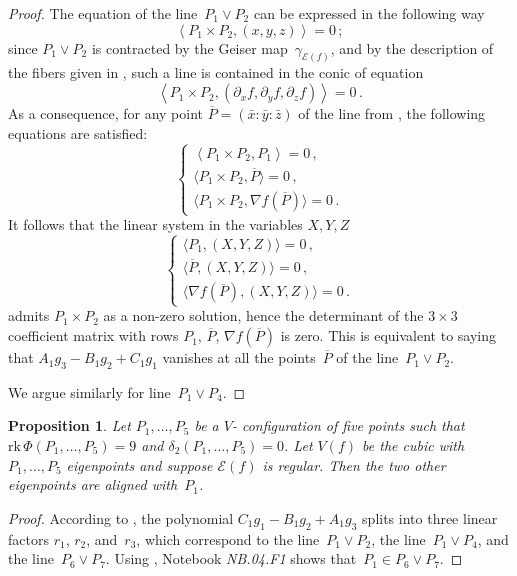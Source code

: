 \documentclass[a4paper, 11pt, reqno]{amsart}
\theoremstyle{plain}
\newtheorem{prop}[lemma]{Proposition}
\theoremstyle{definition}
\newcommand{\p}{\mathbb{P}}
\newcommand{\de}{\partial}
\newcommand{\nb}[2]{\textsl{{NB}.{#1}.{#2}}}
\newcommand{\rk}{\ensuremath{\mathrm{rk}}}
\newcommand{\Eig}[1]{\mathcal{E}\!\left( {#1} \right)}
\begin{document}
\begin{proof}
The equation of the line~$P_1 \vee P_2$ can be expressed in the following way
%
\begin{equation}
\label{eq:lineP1P2}
  \left\langle P_1 \times P_2, (x,y,z) \right\rangle = 0 \,;
\end{equation}
%
since $P_1 \vee P_2$ is contracted by the Geiser map~$\gamma_{\Eig{f}}$,
and by the description of the fibers given in , such a line is contained in the conic of equation
%
\[
  \left\langle P_1 \times P_2, (\de_x f, \de_y f, \de_z f) \right\rangle = 0 \,.
\]
%
As a consequence, for any point $\overline{P} = (\bar x: \bar y: \bar z)$ of the line from , the following equations are satisfied:
%
\[
  \left\{
  \begin{array}{l}
    \left\langle P_1 \times P_2, P_1 \right\rangle = 0 \,,\\[2pt]
    \bigl\langle P_1 \times P_2, \overline{P} \bigr\rangle = 0 \,,\\[2pt]
    \bigl\langle P_1 \times P_2, \nabla f (\overline{P}) \bigr\rangle = 0 \,.
  \end{array}
  \right.
\]
%
It follows that the linear system in the variables $X,Y,Z$
%
\[
  \left\{
  \begin{array}{l}
    \bigl\langle P_1, (X,Y,Z) \bigr\rangle = 0 \,,\\[2pt]
    \bigl\langle \overline{P}, (X,Y,Z) \bigr\rangle = 0 \,,\\[2pt]
    \bigl\langle \nabla f (\overline{P}),
    (X,Y,Z) \bigr\rangle = 0 \,.
  \end{array}
  \right.
\]
%
admits $P_1 \times P_2$ as a non-zero solution,
hence the determinant of the $3 \times 3$ coefficient matrix with rows
 $P_1$, $\overline{P}$, $\nabla f (\overline{P})$ is zero. This is equivalent to saying that $A_1 g_3 - B_1 g_2 + C_1 g_1$ vanishes at all the points~$\overline{P}$ of the line~$P_1 \vee P_2$.

We argue similarly for line~$P_1 \vee P_4$.
\end{proof}
%
\begin{prop}
\label{proposition:third_alignment}
Let $P_1, \dots, P_5$ be a $V$- configuration of five points such that  
$\rk\, \Phi(P_1, \dots, P_5) = 9$ and
$\delta_2(P_1, \dots, P_5) = 0$. Let $V(f)$ be
the cubic with $P_1, \dots, P_5$
eigenpoints and suppose $\Eig{f}$ is 
regular. Then the two other eigenpoints are aligned with~$P_1$.
\end{prop}
\begin{proof}
According to , the polynomial
$C_1g_1-B_1g_2+A_1g_3$ splits into three linear factors $r_1$, $r_2$, and~$r_3$, which
correspond to the line~$P_1 \vee P_2$, the line~$P_1 \vee P_4$, and the line~$P_6 \vee P_7$. Using , Notebook \nb{04}{F1} shows that~$P_1\in P_6 \vee P_7$.
\end{proof}
\end{document}
